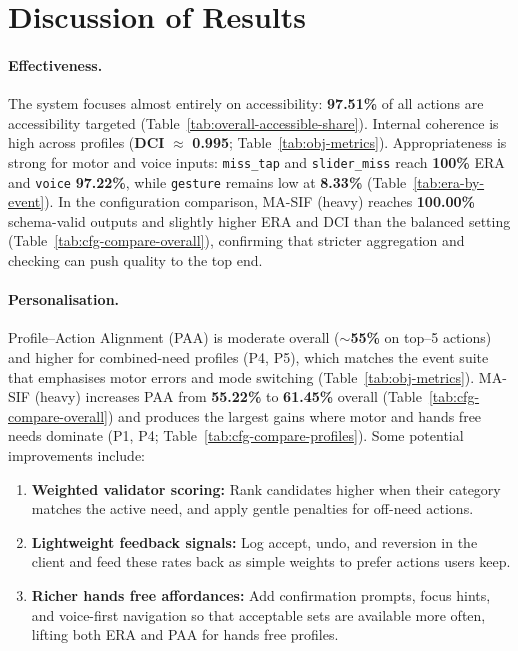 \section{Discussion of Results}
\label{sec:discussion_eval}

\paragraph{Effectiveness.}
The system focuses almost entirely on accessibility: \textbf{97.51\%} of all actions are accessibility targeted (Table~\ref{tab:overall-accessible-share}). Internal coherence is high across profiles (\textbf{DCI} $\approx$ \textbf{0.995}; Table~\ref{tab:obj-metrics}). Appropriateness is strong for motor and voice inputs: \texttt{miss\_tap} and \texttt{slider\_miss} reach \textbf{100\%} ERA and \texttt{voice} \textbf{97.22\%}, while \texttt{gesture} remains low at \textbf{8.33\%} (Table~\ref{tab:era-by-event}). In the configuration comparison, MA-SIF (heavy) reaches \textbf{100.00\%} schema-valid outputs and slightly higher ERA and DCI than the balanced setting (Table~\ref{tab:cfg-compare-overall}), confirming that stricter aggregation and checking can push quality to the top end.

\paragraph{Personalisation.}
Profile–Action Alignment (PAA) is moderate overall (\(\sim\)\textbf{55\%} on top–5 actions) and higher for combined-need profiles (P4, P5), which matches the event suite that emphasises motor errors and mode switching (Table~\ref{tab:obj-metrics}). MA-SIF (heavy) increases PAA from \textbf{55.22\%} to \textbf{61.45\%} overall (Table~\ref{tab:cfg-compare-overall}) and produces the largest gains where motor and hands free needs dominate (P1, P4; Table~\ref{tab:cfg-compare-profiles}). Some potential improvements include:
\begin{enumerate}
  \item \textbf{Weighted validator scoring:} Rank candidates higher when their category matches the active need, and apply gentle penalties for off-need actions.
  \item \textbf{Lightweight feedback signals:} Log accept, undo, and reversion in the client and feed these rates back as simple weights to prefer actions users keep.
  \item \textbf{Richer hands free affordances:} Add confirmation prompts, focus hints, and voice-first navigation so that acceptable sets are available more often, lifting both ERA and PAA for hands free profiles.
\end{enumerate}

